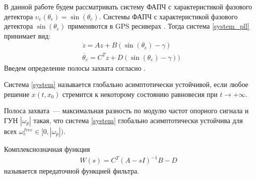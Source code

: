 \documentclass[a4paper,article,14pt]{extarticle}
\begin{document}
В данной работе будем рассматривать систему ФАПЧ с характеристикой фазового детектора $\upsilon_e(\theta_e) = \operatorname{sin}(\theta_e)$. Системы ФАПЧ с характеристикой фазового детектора $\operatorname{sin}(\theta_e)$ применяются в GPS ресиверах \cite{kaplan}. Тогда система \eqref{system_pll} принимает вид:
 \begin{equation}\label{system}
 \begin{aligned}
 &\dot{z} = Az + B(\operatorname{sin}(\theta_e) - \gamma)\\
 &\dot{\theta_e} = C^Tz + D(\operatorname{sin}(\theta_e) - \gamma))
 \end{aligned}
\end{equation}
Введем определение полосы захвата согласно \cite{kuznetsov_article}.
\begin{definition}
Система \eqref{system} называется глобально асимптотически устойчивой, если любое решение $x(t, x_0)$  стремится к некоторому состоянию равновесия при $t \rightarrow +\infty$.
\end{definition}

\begin{definition}
Полоса захвата~--- максимальная разность по модулю частот опорного сигнала и ГУН $|\omega_p|$ такая, что система \eqref{system} глобально асимптотически устойчива для всех $\omega_e^{free} \in [0, |\omega_p|)$.
\end{definition}

\begin{definition}
Комплекснозначная функция  
\begin{equation}
 \begin{aligned}
 W(s)=C^T \left(A-sI\right)^{-1}B - D
 \end{aligned}
\end{equation}
называется передаточной функцией фильтра.
\end{definition}
\end{document}
